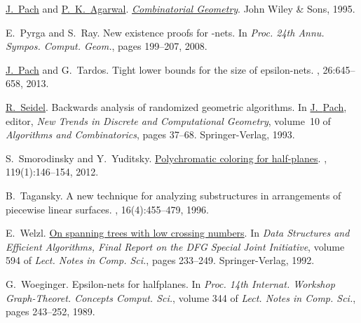 \documentclass[12pt]{article}
\begin{document}
\begin{thebibliography}{MSW90}
\href{http://www.math.nyu.edu/~pach}{J.~{Pach}} and \href{http://www.cs.duke.edu/~pankaj}{P.~K.~{Agarwal}}.
\newblock \href{http://www.addall.com/Browse/Detail/0471588903.html}{{\em
  Combinatorial Geometry}}.
\newblock John Wiley \& Sons, 1995.

E.~Pyrga and S.~Ray.
\newblock  New existence proofs for -nets.
\newblock In {\em Proc. 24th Annu. Sympos. Comput. Geom.\CNFSoCG}, pages
  199--207, 2008.

\href{http://www.math.nyu.edu/~pach}{J.~{Pach}} and G.~Tardos.
\newblock  Tight lower bounds for the size of epsilon-nets.
, 26:645--658, 2013.

\href{http://www-tcs.cs.uni-sb.de/seidel/}{R.~{Seidel}}.
\newblock  Backwards analysis of randomized geometric algorithms.
\newblock In \href{http://www.math.nyu.edu/~pach}{J.~{Pach}}, editor, {\em New Trends in Discrete and Computational
  Geometry}, volume~10 of {\em Algorithms and Combinatorics}, pages 37--68.
  Springer-Verlag, 1993.

S.~Smorodinsky and Y.~Yuditsky.
\newblock \href{http://dx.doi.org/10.1016/j.jcta.2011.07.001}{Polychromatic
  coloring for half-planes}.
, 119(1):146--154, 2012.

B.~Tagansky.
\newblock  A new technique for analyzing substructures in arrangements of
  piecewise linear surfaces.
, 16(4):455--479, 1996.

E.~Welzl.
\newblock
  \href{http://www.inf.ethz.ch/personal/emo/ps-files/LowCross-LNCS594.ps}{On
  spanning trees with low crossing numbers}.
\newblock In {\em Data Structures and Efficient Algorithms, Final Report on the
  DFG Special Joint Initiative}, volume 594 of {\em Lect. Notes in Comp. Sci.},
  pages 233--249. Springer-Verlag, 1992.

G.~Woeginger.
\newblock  Epsilon-nets for halfplanes.
\newblock In {\em Proc. 14th Internat. Workshop Graph-Theoret. Concepts Comput.
  Sci.}, volume 344 of {\em Lect. Notes in Comp. Sci.}, pages 243--252, 1989.

\end{thebibliography}
\end{document}
